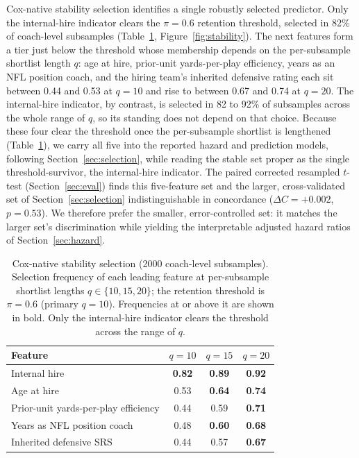 \documentclass[12pt,USenglish]{article}
\begin{document}
Cox-native stability selection identifies a single robustly selected predictor. Only the internal-hire indicator clears the $\pi = 0.6$ retention threshold, selected in 82\% of coach-level subsamples (Table~\ref{tab:stability}, Figure~\ref{fig:stability}). The next features form a tier just below the threshold whose membership depends on the per-subsample shortlist length $q$: age at hire, prior-unit yards-per-play efficiency, years as an NFL position coach, and the hiring team's inherited defensive rating each sit between 0.44 and 0.53 at $q = 10$ and rise to between 0.67 and 0.74 at $q = 20$. The internal-hire indicator, by contrast, is selected in 82 to 92\% of subsamples across the whole range of $q$, so its standing does not depend on that choice. Because these four clear the threshold once the per-subsample shortlist is lengthened (Table~\ref{tab:stability}), we carry all five into the reported hazard and prediction models, following Section~\ref{sec:selection}, while reading the stable set proper as the single threshold-survivor, the internal-hire indicator. The paired corrected resampled $t$-test (Section~\ref{sec:eval}) finds this five-feature set and the larger, cross-validated set of Section~\ref{sec:selection} indistinguishable in concordance ($\Delta C = +0.002$, $p = 0.53$). We therefore prefer the smaller, error-controlled set: it matches the larger set's discrimination while yielding the interpretable adjusted hazard ratios of Section~\ref{sec:hazard}.

\begin{table}[!ht]
\caption{Cox-native stability selection (2000 coach-level subsamples). Selection frequency of each leading feature at per-subsample shortlist lengths $q \in \{10, 15, 20\}$; the retention threshold is $\pi = 0.6$ (primary $q = 10$). Frequencies at or above it are shown in bold. Only the internal-hire indicator clears the threshold across the range of $q$.}
\label{tab:stability}
\small
\begin{tabular}{lccc}
\toprule
Feature & $q = 10$ & $q = 15$ & $q = 20$ \\
\midrule
Internal hire & \textbf{0.82} & \textbf{0.89} & \textbf{0.92} \\
Age at hire & 0.53 & \textbf{0.64} & \textbf{0.74} \\
Prior-unit yards-per-play efficiency & 0.44 & 0.59 & \textbf{0.71} \\
Years as NFL position coach & 0.48 & \textbf{0.60} & \textbf{0.68} \\
Inherited defensive SRS & 0.44 & 0.57 & \textbf{0.67} \\
\bottomrule
\end{tabular}
\end{table}
\end{document}
